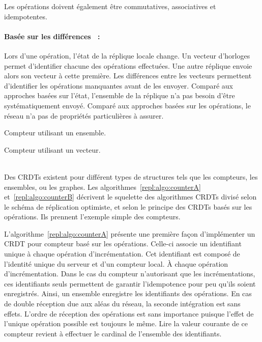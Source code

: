 \noindent Les opérations doivent également être commutatives, associatives et
idempotentes.

\paragraph{Basée sur les différences~\cite{vanderlinde2016delta} :} Lors d'une
opération, l'état de la réplique locale change. Un vecteur d'horloges permet
d'identifier chacune des opérations effectuées. Une autre réplique envoie alors
son vecteur à cette première. Les différences entre les vecteurs permettent
d'identifier les opérations manquantes avant de les envoyer. Comparé aux
approches basées sur l'état, l'ensemble de la réplique n'a pas besoin d'être
systématiquement envoyé. Comparé aux approches basées sur les opérations, le
réseau n'a pas de propriétés particulières à assurer.

{\noindent%
\begin{minipage}[t]{0.48\textwidth}
  \begin{algorithm}[H]
    
    \caption[Compteur utilisant un ensemble]
    {\label{repl:algo:counterA} Compteur utilisant un ensemble.}
  \end{algorithm}
\end{minipage}%
\hfill%
\begin{minipage}[t]{0.48\textwidth}
  \begin{algorithm}[H]
    
    \caption[Compteur utilisant un vecteur]
    {\label{repl:algo:counterB} Compteur utilisant un vecteur.}
  \end{algorithm}
\end{minipage}
} \\

Des CRDTs existent pour différent types de structures tels que les compteurs,
les ensembles, ou les graphes. Les algorithmes~\ref{repl:algo:counterA}
et~\ref{repl:algo:counterB} décrivent le squelette des algorithmes CRDTs divisé
selon le schéma de réplication optimiste, et selon le principe des CRDTs basés
sur les opérations. Ils prennent l'exemple simple des compteurs.

L'algorithme~\ref{repl:algo:counterA} présente une première façon d'implémenter
un CRDT pour compteur basé sur les opérations. Celle-ci associe un identifiant
unique à chaque opération d'incrémentation. Cet identifiant est composé de
l'identité unique du serveur et d'un compteur local. À chaque opération
d'incrémentation. Dans le cas du compteur n'autorisant que les incrémentations,
ces identifiants seuls permettent de garantir l'idempotence pour peu qu'ils
soient enregistrés. Ainsi, un ensemble enregistre les identifiants des
opérations. En cas de double réception due aux aléas du réseau, la seconde
intégration est sans effets. L'ordre de réception des opérations est sans
importance puisque l'effet de l'unique opération possible est toujours le
même. Lire la valeur courante de ce compteur revient à effectuer le cardinal de
l'ensemble des identifiants.

